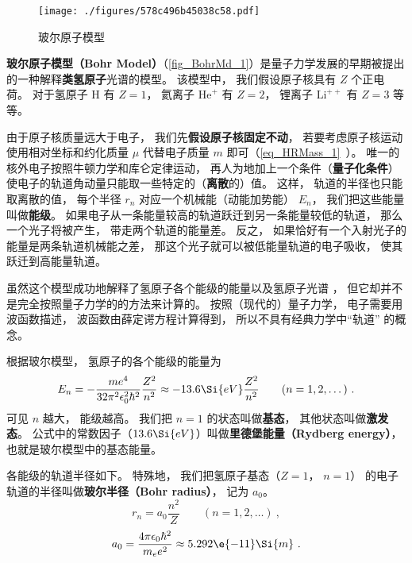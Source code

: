 

\begin{figure}[ht]
\centering
\texttt{[image: ./figures/578c496b45038c58.pdf]}
\caption{玻尔原子模型} \label{fig_BohrMd_1}
\end{figure}

\textbf{玻尔原子模型（Bohr Model）}（\autoref{fig_BohrMd_1}）是量子力学发展的早期被提出的一种解释\textbf{类氢原子}光谱的模型。 该模型中， 我们假设原子核具有 $Z$ 个正电荷。 对于氢原子 $\mathrm{H}$ 有 $Z = 1$， 氦离子 $\mathrm{He}^+$ 有 $Z = 2$， 锂离子 $\mathrm{Li}^{++}$ 有 $Z = 3$ 等等。

由于原子核质量远大于电子， 我们先\textbf{假设原子核固定不动}， 若要考虑原子核运动使用相对坐标和约化质量 $\mu$ 代替电子质量 $m$ 即可（\autoref{eq_HRMass_1}~）。
唯一的核外电子按照牛顿力学和库仑定律运动， 再人为地加上一个条件（\textbf{量子化条件}）使电子的轨道角动量只能取一些特定的（\textbf{离散}的）值。 这样， 轨道的半径也只能取离散的值， 每个半径 $r_n$ 对应一个机械能（动能加势能） $E_n$， 我们把这些能量叫做\textbf{能级}。 如果电子从一条能量较高的轨道跃迁到另一条能量较低的轨道， 那么一个光子将被产生， 带走两个轨道的能量差。 反之， 如果恰好有一个入射光子的能量是两条轨道机械能之差， 那这个光子就可以被低能量轨道的电子吸收， 使其跃迁到高能量轨道。

虽然这个模型成功地解释了氢原子各个能级的能量以及氢原子光谱%
， 但它却并不是完全按照量子力学的的方法来计算的。 按照（现代的）量子力学， 电子需要用波函数描述， 波函数由薛定谔方程计算得到， 所以不具有经典力学中“轨道” 的概念。

根据玻尔模型， 氢原子的各个能级的能量为
\begin{equation}
E_n =  - \frac{m e^4}{32 \pi^2 \epsilon_0^2 \hbar ^2} \frac{Z^2}{n^2} \approx - 13.6\Si{eV} \frac{Z^2}{n^2}
\qquad (n = 1, 2, \dots)~.
\end{equation}
可见 $n$ 越大， 能级越高。 我们把 $n = 1$ 的状态叫做\textbf{基态}， 其他状态叫做\textbf{激发态}。 公式中的常数因子（$13.6\Si{eV}$）叫做\textbf{里德堡能量（Rydberg energy）}， 也就是玻尔模型中的基态能量。

各能级的轨道半径如下。 特殊地， 我们把氢原子基态（$Z = 1$， $n = 1$） 的电子轨道的半径叫做\textbf{玻尔半径（Bohr radius）}， 记为 $a_0$。
\begin{equation}\label{eq_BohrMd_1}
r_n = a_0 \frac{n^2}{Z}
\qquad (n = 1, 2, \dots)~,
\end{equation}
\begin{equation}\label{eq_BohrMd_3}
a_0 = \frac{4\pi \epsilon_0 \hbar^2}{m_e e^2} \approx 5.292\e{-11}\Si{m}~.
\end{equation}


